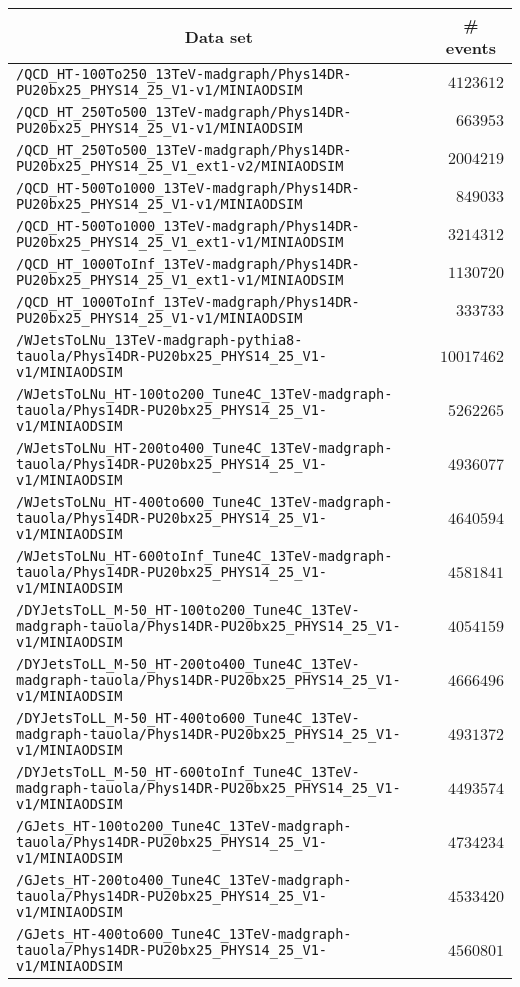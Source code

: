 \begin{center}
\begin{tabular}{lr}
\toprule
\multicolumn{1}{c}{Data set}&\multicolumn{1}{c}{\# events}\tabularnewline
\midrule
\verb!/QCD_HT-100To250_13TeV-madgraph/Phys14DR-PU20bx25_PHYS14_25_V1-v1/MINIAODSIM! &$ 4123612$\tabularnewline
\verb!/QCD_HT_250To500_13TeV-madgraph/Phys14DR-PU20bx25_PHYS14_25_V1-v1/MINIAODSIM! &$  663953$\tabularnewline
\verb!/QCD_HT_250To500_13TeV-madgraph/Phys14DR-PU20bx25_PHYS14_25_V1_ext1-v2/MINIAODSIM! &$ 2004219$\tabularnewline
\verb!/QCD_HT-500To1000_13TeV-madgraph/Phys14DR-PU20bx25_PHYS14_25_V1-v1/MINIAODSIM! &$  849033$\tabularnewline
\verb!/QCD_HT-500To1000_13TeV-madgraph/Phys14DR-PU20bx25_PHYS14_25_V1_ext1-v1/MINIAODSIM! &$ 3214312$\tabularnewline
\verb!/QCD_HT_1000ToInf_13TeV-madgraph/Phys14DR-PU20bx25_PHYS14_25_V1_ext1-v1/MINIAODSIM! &$ 1130720$\tabularnewline
\verb!/QCD_HT_1000ToInf_13TeV-madgraph/Phys14DR-PU20bx25_PHYS14_25_V1-v1/MINIAODSIM! &$  333733$\tabularnewline
\verb!/WJetsToLNu_13TeV-madgraph-pythia8-tauola/Phys14DR-PU20bx25_PHYS14_25_V1-v1/MINIAODSIM! &$10017462$\tabularnewline
\verb!/WJetsToLNu_HT-100to200_Tune4C_13TeV-madgraph-tauola/Phys14DR-PU20bx25_PHYS14_25_V1-v1/MINIAODSIM! &$ 5262265$\tabularnewline
\verb!/WJetsToLNu_HT-200to400_Tune4C_13TeV-madgraph-tauola/Phys14DR-PU20bx25_PHYS14_25_V1-v1/MINIAODSIM! &$ 4936077$\tabularnewline
\verb!/WJetsToLNu_HT-400to600_Tune4C_13TeV-madgraph-tauola/Phys14DR-PU20bx25_PHYS14_25_V1-v1/MINIAODSIM! &$ 4640594$\tabularnewline
\verb!/WJetsToLNu_HT-600toInf_Tune4C_13TeV-madgraph-tauola/Phys14DR-PU20bx25_PHYS14_25_V1-v1/MINIAODSIM! &$ 4581841$\tabularnewline
\verb!/DYJetsToLL_M-50_HT-100to200_Tune4C_13TeV-madgraph-tauola/Phys14DR-PU20bx25_PHYS14_25_V1-v1/MINIAODSIM! &$ 4054159$\tabularnewline
\verb!/DYJetsToLL_M-50_HT-200to400_Tune4C_13TeV-madgraph-tauola/Phys14DR-PU20bx25_PHYS14_25_V1-v1/MINIAODSIM! &$ 4666496$\tabularnewline
\verb!/DYJetsToLL_M-50_HT-400to600_Tune4C_13TeV-madgraph-tauola/Phys14DR-PU20bx25_PHYS14_25_V1-v1/MINIAODSIM! &$ 4931372$\tabularnewline
\verb!/DYJetsToLL_M-50_HT-600toInf_Tune4C_13TeV-madgraph-tauola/Phys14DR-PU20bx25_PHYS14_25_V1-v1/MINIAODSIM! &$ 4493574$\tabularnewline
\verb!/GJets_HT-100to200_Tune4C_13TeV-madgraph-tauola/Phys14DR-PU20bx25_PHYS14_25_V1-v1/MINIAODSIM! &$ 4734234$\tabularnewline
\verb!/GJets_HT-200to400_Tune4C_13TeV-madgraph-tauola/Phys14DR-PU20bx25_PHYS14_25_V1-v1/MINIAODSIM! &$ 4533420$\tabularnewline
\verb!/GJets_HT-400to600_Tune4C_13TeV-madgraph-tauola/Phys14DR-PU20bx25_PHYS14_25_V1-v1/MINIAODSIM! &$ 4560801$\tabularnewline

\end{tabular}
\end{center}
